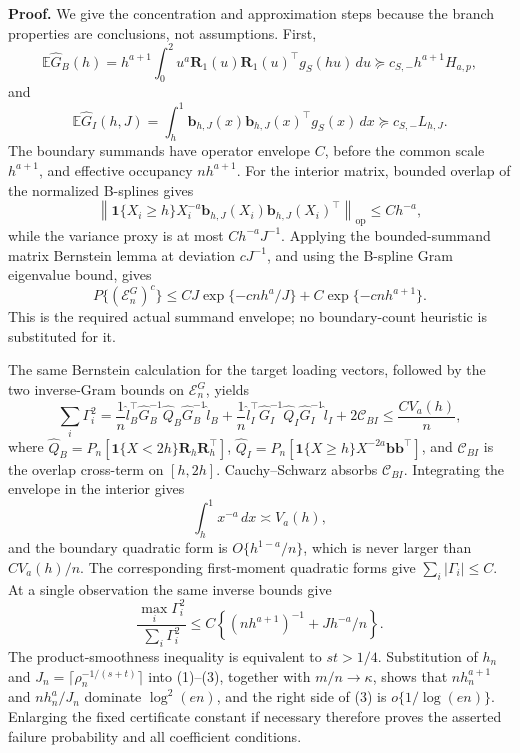 \textbf{Proof.}
We give the concentration and approximation steps because the branch properties are conclusions, not assumptions. First,
\[
\mathbb E\widehat G_B(h)=h^{a+1}\int_0^2u^a\mathbf R_1(u)\mathbf R_1(u)^\top g_S(hu)\,du
\succeq c_{S,-}h^{a+1}H_{a,p},
\]
and
\[
\mathbb E\widehat G_I(h,J)=\int_h^1\mathbf b_{h,J}(x)\mathbf b_{h,J}(x)^\top g_S(x)\,dx
\succeq c_{S,-}L_{h,J}.
\]
The boundary summands have operator envelope \(C\), before the common scale \(h^{a+1}\), and effective occupancy \(nh^{a+1}\). For the interior matrix, bounded overlap of the normalized B-splines gives
\[
\left\|\mathbf 1\{X_i\ge h\}X_i^{-a}\mathbf b_{h,J}(X_i)\mathbf b_{h,J}(X_i)^\top\right\|_{\mathrm{op}}\le Ch^{-a},
\]
while the variance proxy is at most \(Ch^{-a}J^{-1}\). Applying the bounded-summand matrix Bernstein lemma at deviation \(cJ^{-1}\), and using the B-spline Gram eigenvalue bound, gives
\[
P\{(\mathcal E_n^G)^c\}\le C J\exp\{-cnh^a/J\}+C\exp\{-cnh^{a+1}\}.
\tag{1}
\]
This is the required actual summand envelope; no boundary-count heuristic is substituted for it.

The same Bernstein calculation for the target loading vectors, followed by the two inverse-Gram bounds on \(\mathcal E_n^G\), yields
\[
\sum_i\Gamma_i^2
=\frac1n\widehat l_B^\top\widehat G_B^{-1}\widehat Q_B\widehat G_B^{-1}\widehat l_B
+\frac1n\widehat l_I^\top\widehat G_I^{-1}\widehat Q_I\widehat G_I^{-1}\widehat l_I
+2\mathcal C_{BI}
\le \frac{CV_a(h)}n,
\tag{2}
\]
where \(\widehat Q_B=P_n[\mathbf1\{X<2h\}\mathbf R_h\mathbf R_h^\top]\), \(\widehat Q_I=P_n[\mathbf1\{X\ge h\}X^{-2a}\mathbf b\mathbf b^\top]\), and \(\mathcal C_{BI}\) is the overlap cross-term on \([h,2h]\). Cauchy--Schwarz absorbs \(\mathcal C_{BI}\). Integrating the envelope in the interior gives
\[
\int_h^1x^{-a}\,dx\asymp V_a(h),
\]
and the boundary quadratic form is \(O\{h^{1-a}/n\}\), which is never larger than \(CV_a(h)/n\). The corresponding first-moment quadratic forms give \(\sum_i|\Gamma_i|\le C\). At a single observation the same inverse bounds give
\[
\frac{\max_i\Gamma_i^2}{\sum_i\Gamma_i^2}
\le C\left\{(nh^{a+1})^{-1}+Jh^{-a}/n\right\}.
\tag{3}
\]
The product-smoothness inequality is equivalent to \(st>1/4\). Substitution of \(h_n\) and \(J_n=\lceil\rho_n^{-1/(s+t)}\rceil\) into (1)--(3), together with \(m/n\to\kappa\), shows that \(nh_n^{a+1}\) and \(nh_n^a/J_n\) dominate \(\log^2(en)\), and the right side of (3) is \(o\{1/\log(en)\}\). Enlarging the fixed certificate constant if necessary therefore proves the asserted failure probability and all coefficient conditions.

